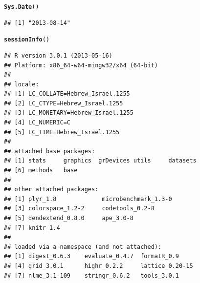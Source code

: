 \documentclass[shortnames,nojss,article]{jss}\usepackage[]{graphicx}\usepackage[]{color}
\makeatletter
\newcommand{\hlstd}[1]{\textcolor[rgb]{0.345,0.345,0.345}{#1}}%
\newcommand{\hlkwd}[1]{\textcolor[rgb]{0.737,0.353,0.396}{\textbf{#1}}}%
\newenvironment{kframe}{%
 \def\at@end@of@kframe{}%
 \ifinner\ifhmode%
  \def\at@end@of@kframe{\end{minipage}}%
  \begin{minipage}{\columnwidth}%
 \fi\fi%
 \def\FrameCommand##1{\hskip\@totalleftmargin \hskip-\fboxsep
 \colorbox{shadecolor}{##1}\hskip-\fboxsep
     \hskip-\linewidth \hskip-\@totalleftmargin \hskip\columnwidth}%
 \MakeFramed {\advance\hsize-\width
   \@totalleftmargin\z@ \linewidth\hsize
   \@setminipage}}%
 {\par\unskip\endMakeFramed%
 \at@end@of@kframe}
\newenvironment{knitrout}{}{} %
\makeatother
\begin{document}
\begin{knitrout}
\color{fgcolor}\begin{kframe}
\begin{alltt}
\hlkwd{Sys.Date}\hlstd{()}
\end{alltt}
\begin{verbatim}
## [1] "2013-08-14"
\end{verbatim}
\begin{alltt}
\hlkwd{sessionInfo}\hlstd{()}
\end{alltt}
\begin{verbatim}
## R version 3.0.1 (2013-05-16)
## Platform: x86_64-w64-mingw32/x64 (64-bit)
## 
## locale:
## [1] LC_COLLATE=Hebrew_Israel.1255 
## [2] LC_CTYPE=Hebrew_Israel.1255   
## [3] LC_MONETARY=Hebrew_Israel.1255
## [4] LC_NUMERIC=C                  
## [5] LC_TIME=Hebrew_Israel.1255    
## 
## attached base packages:
## [1] stats     graphics  grDevices utils     datasets 
## [6] methods   base     
## 
## other attached packages:
## [1] plyr_1.8             microbenchmark_1.3-0
## [3] colorspace_1.2-2     codetools_0.2-8     
## [5] dendextend_0.8.0     ape_3.0-8           
## [7] knitr_1.4           
## 
## loaded via a namespace (and not attached):
## [1] digest_0.6.3    evaluate_0.4.7  formatR_0.9    
## [4] grid_3.0.1      highr_0.2.2     lattice_0.20-15
## [7] nlme_3.1-109    stringr_0.6.2   tools_3.0.1
\end{verbatim}
\end{kframe}
\end{knitrout}
\end{document}
